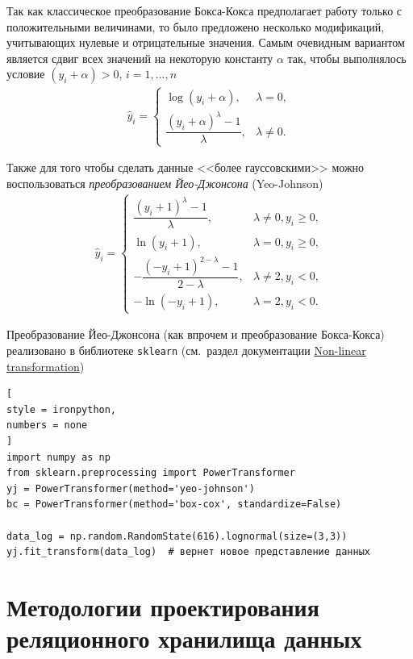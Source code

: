 \documentclass[%
	11pt,
	a4paper,
	utf8,
		]{article}
\begin{document}
Так как классическое преобразование Бокса-Кокса предполагает работу только с положительными величинами, то было предложено несколько модификаций, учитывающих нулевые и отрицательные значения. Самым очевидным вариантом является сдвиг всех значений на некоторую константу $ \alpha $ так, чтобы выполнялось условие $ (y_i + \alpha) > 0, \, i = 1,\dots, n $
\begin{align*}
	\hat{y}_i =
	\begin{cases}
		\log (y_i + \alpha), &\lambda = 0,\\
		\dfrac{(y_i + \alpha)^\lambda - 1}{\lambda}, &\lambda \neq 0.
	\end{cases}
\end{align*}

Также для того чтобы сделать данные <<более гауссовскими>> можно воспользоваться \emph{преобразованием Йео-Джонсона} (Yeo-Johnson)
\begin{align*}
	\hat{y}_i = 
	\begin{cases}
		\dfrac{(y_i + 1)^\lambda - 1}{\lambda}, &\lambda \neq 0, y_i \geqslant 0,\\
		\ln(y_i + 1), &\lambda = 0, y_i \geqslant 0,\\
		- \dfrac{(-y_i + 1)^{2 - \lambda} - 1}{2 - \lambda}, &\lambda \neq 2, y_i < 0,\\
		-\ln(-y_i + 1), &\lambda = 2, y_i < 0.
	\end{cases}
\end{align*}

Преобразование Йео-Джонсона (как впрочем и преобразование Бокса-Кокса) реализовано в библиотеке \texttt{sklearn} (см.~раздел документации \href{https://scikit-learn.org/stable/modules/preprocessing.html#preprocessing-transformer}{Non-linear transformation})
\begin{lstlisting}[
style = ironpython,
numbers = none
]
import numpy as np
from sklearn.preprocessing import PowerTransformer
yj = PowerTransformer(method='yeo-johnson')
bc = PowerTransformer(method='box-cox', standardize=False)

data_log = np.random.RandomState(616).lognormal(size=(3,3))
yj.fit_transform(data_log)  # вернет новое представление данных
\end{lstlisting}



\section{Методологии проектирования реляционного хранилища данных}
\end{document}
